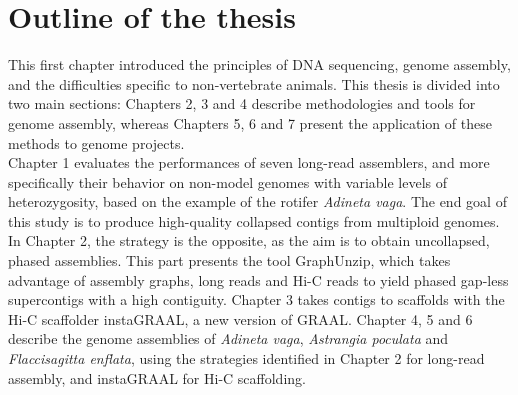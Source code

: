 \section{Outline of the thesis}

This first chapter introduced the principles of DNA sequencing, genome assembly, and the difficulties specific to non-vertebrate animals. This thesis is divided into two main sections: Chapters 2, 3 and 4 describe methodologies and tools for genome assembly, whereas Chapters 5, 6 and 7 present the application of these methods to genome projects. \\
Chapter 1 evaluates the performances of seven long-read assemblers, and more specifically their behavior on non-model genomes with variable levels of heterozygosity, based on the example of the rotifer \textit{Adineta vaga}. The end goal of this study is to produce high-quality collapsed contigs from multiploid genomes. In Chapter 2, the strategy is the opposite, as the aim is to obtain uncollapsed, phased assemblies. This part presents the tool GraphUnzip, which takes advantage of assembly graphs, long reads and Hi-C reads to yield phased gap-less supercontigs with a high contiguity. Chapter 3 takes contigs to scaffolds with the Hi-C scaffolder instaGRAAL, a new version of GRAAL. Chapter 4, 5 and 6 describe the genome assemblies of \textit{Adineta vaga}, \textit{Astrangia poculata} and \textit{Flaccisagitta enflata}, using the strategies identified in Chapter 2 for long-read assembly, and instaGRAAL for Hi-C scaffolding.  \\